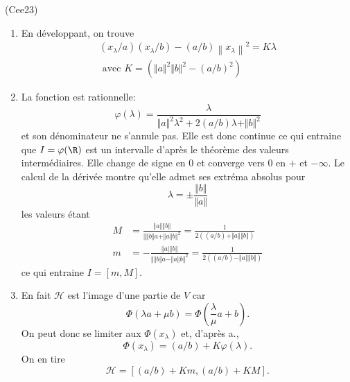 \begin{tiny}(Cee23)\end{tiny} 
\begin{enumerate}
  \item  En développant, on trouve
\begin{multline*}
  (x_\lambda /a)(x_\lambda /b) -(a/b)\left\|x_\lambda \right\|^2   = K\lambda \\ \text{ avec } K= \left( \Vert a \Vert ^2 \Vert b \Vert^2 -(a/b)^2\right)
\end{multline*}

  \item La fonction est  rationnelle:
\begin{displaymath}
\varphi(\lambda) =  \frac{\lambda}{\Vert a\Vert^2 \lambda^2 + 2(a/b)\lambda + \Vert b\Vert^2}
\end{displaymath}
et son dénominateur ne s'annule pas. Elle est donc continue ce qui entraine que $I= \varphi(\R)$ est un intervalle d'après le théorème des valeurs intermédiaires. Elle change de signe en $0$ et converge vers $0$ en $+$ et $- \infty$. Le calcul de la dérivée montre qu'elle admet ses extréma absolus pour
\begin{displaymath}
  \lambda = \pm \frac{\Vert b \Vert}{\Vert a \Vert}
\end{displaymath}
les valeurs étant
\begin{align*}
  M &= \frac{\Vert a\Vert \Vert b\Vert}{\Vert \Vert b\Vert a + \Vert a\Vert b\Vert^2}
  = \frac{1}{2\left((a/b) + \Vert a\Vert \Vert b \Vert \right) }\\
 m &= -\frac{\Vert a\vert \Vert b\Vert}{\Vert \Vert b\Vert a - \Vert a\Vert b\Vert^2}
 = \frac{1}{2\left((a/b) - \Vert a\Vert \Vert b \Vert \right) }
\end{align*}
ce qui entraine $I = \left[ m, M \right]$. 
  \item En fait $\mathcal{H}$ est l'image d'une partie de $V$ car  
\begin{displaymath}
\Phi(\lambda a + \mu b) = \Phi(\frac{\lambda}{\mu }a + b)  .
\end{displaymath}
On peut donc se limiter aux $\Phi(x_\lambda)$ et, d'après a.,
\begin{displaymath}
\Phi(x_\lambda) = (a/b) + K\varphi(\lambda).  
\end{displaymath}
On en tire
\begin{displaymath}
  \mathcal{H} = \left[(a/b) + Km, (a/b)+ KM \right] .
\end{displaymath}


\end{enumerate}
